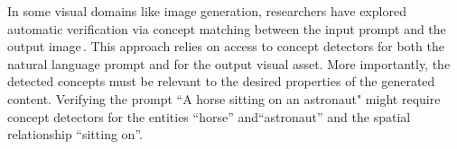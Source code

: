%
In some visual domains like image generation, researchers have
explored automatic verification via concept matching between the input
prompt and the output image\,\cite{Johnson_2017_ICCV,Hessel2021CLIPScoreAR,lee2023holisticevaluationtexttoimagemodels,hu2023tifa,JaeminCho2024}.
This approach relies on access to
concept detectors for both the natural language prompt
and for the output visual asset.
%
More importantly, the detected concepts must be relevant to the desired
properties of the generated content.
%
%
Verifying the prompt ``A horse sitting on an astronaut" might
require concept detectors for the entities ``horse'' and``astronaut''
and the spatial relationship ``sitting on''.
 


